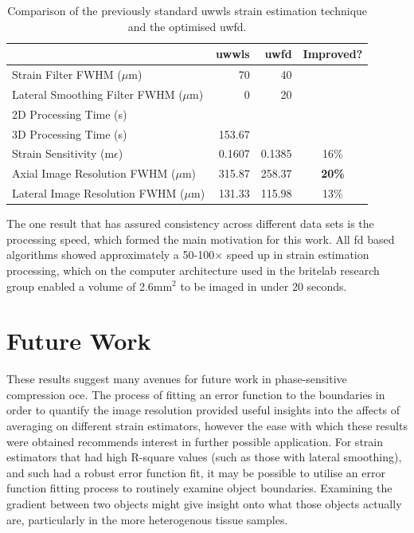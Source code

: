 \begin{table}
	\begin{tabularx}{\textwidth}{Yrrc}
		\toprule
		& \textbf{\ac{uwwls}} & \textbf{\ac{uwfd}} & \textbf{Improved?}\\
		\midrule 
		Strain Filter FWHM ($\mu$m) & 70 & 40 \\
		Lateral Smoothing Filter FWHM ($\mu$m) & 0 & 20 \\
		\midrule
		2D Processing Time (s) & & \\
		3D Processing Time (s) & 153.67 & \\
		Strain Sensitivity (m$\epsilon$) & 0.1607 & 0.1385 & 16\% \\
		Axial Image Resolution FWHM ($\mu$m) & 315.87 & 258.37 & \textbf{20\%} \\
		Lateral Image Resolution FWHM ($\mu$m) & 131.33 & 115.98 & 13\% \\
		\bottomrule
	\end{tabularx}
	\caption{Comparison of the previously standard \ac{uwwls} strain estimation technique and the optimised \ac{uwfd}.}
	\label{comparison_table}
\end{table}

The one result that has assured consistency across different data sets is the processing speed, which formed the main motivation for this work. All \ac{fd} based algorithms showed approximately a 50-100$\times$ speed up in strain estimation processing, which on the computer architecture used in the \ac{britelab} research group enabled a volume of 2.6$\text{mm}^2$ to be imaged in under 20 seconds.

\section{Future Work}

These results suggest many avenues for future work in phase-sensitive compression \ac{oce}. The process of fitting an error function to the boundaries in order to quantify the image resolution provided useful insights into the affects of averaging on different strain estimators, however the ease with which these results were obtained recommends interest in further possible application. For strain estimators that had high R-square values (such as those with lateral smoothing), and such had a robust error function fit, it may be possible to utilise an error function fitting process to routinely examine object boundaries. Examining the gradient between two objects might give insight onto what those objects actually are, particularly in the more heterogenous tissue samples. 

